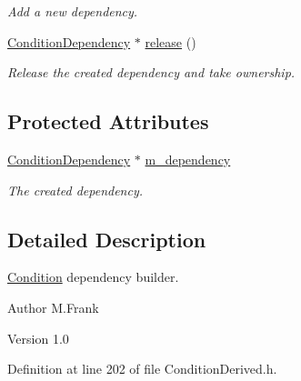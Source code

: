 \begin{DoxyCompactItemize}
\begin{DoxyCompactList}\small\item\em Add a new dependency. \item\end{DoxyCompactList}\item 
\hyperlink{class_d_d4hep_1_1_conditions_1_1_condition_dependency}{ConditionDependency} $\ast$ \hyperlink{class_d_d4hep_1_1_conditions_1_1_dependency_builder_a184c80416875c91985dda61b26a04022}{release} ()
\begin{DoxyCompactList}\small\item\em Release the created dependency and take ownership. \item\end{DoxyCompactList}\end{DoxyCompactItemize}
\subsection*{Protected Attributes}
\begin{DoxyCompactItemize}
\item 
\hyperlink{class_d_d4hep_1_1_conditions_1_1_condition_dependency}{ConditionDependency} $\ast$ \hyperlink{class_d_d4hep_1_1_conditions_1_1_dependency_builder_a038744f80e334eb539859fbc60614836}{m\_\-dependency}
\begin{DoxyCompactList}\small\item\em The created dependency. \item\end{DoxyCompactList}\end{DoxyCompactItemize}


\subsection{Detailed Description}
\hyperlink{class_d_d4hep_1_1_conditions_1_1_condition}{Condition} dependency builder. \begin{DoxyAuthor}{Author}
M.Frank 
\end{DoxyAuthor}
\begin{DoxyVersion}{Version}
1.0 
\end{DoxyVersion}


Definition at line 202 of file ConditionDerived.h.

